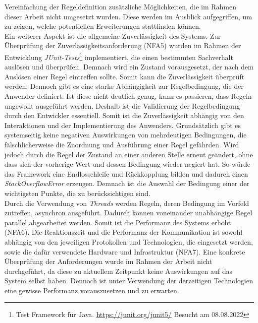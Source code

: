         Vereinfachung der Regeldefinition zusätzliche Möglichkeiten, die im Rahmen dieser Arbeit nicht umgesetzt wurden. Diese werden im Ausblick 
        aufgegriffen, um zu zeigen, welche potentiellen Erweiterungen stattfinden können. 
        \\
        \linebreak
        Ein weiterer Aspekt ist die allgemeine Zuverlässigkeit des Systems. Zur Überprüfung der Zuverlässigkeitsanforderung (NFA5) wurden im Rahmen der 
        Entwicklung \textit{JUnit-Tests}\footnote{Test Framework für Java. \url{https://junit.org/junit5/} Besucht am 08.08.2022} implementiert, die 
        einen bestimmten Sachverhalt auslösen und überprüfen. Demnach wird ein Zustand vorausgesetzt, der nach dem Auslösen einer Regel eintreffen sollte. Somit kann 
        die Zuverlässigkeit überprüft werden. Dennoch gibt es eine starke Abhängigkeit zur Regelbedingung, die der Anwender definiert. Ist diese 
        nicht deutlich genug, kann es passieren, dass Regeln ungewollt ausgeführt werden. Deshalb ist die Validierung der Regelbedingung durch den 
        Entwickler essentiell. Somit ist die Zuverlässigkeit abhängig von den Interaktionen und der Implementierung des Anwenders. Grundsätzlich gibt es 
        systemseitig keine negativen Auswirkungen von mehrdeutigen Bedingungen, die fälschlicherweise die Zuordnung und Ausführung einer Regel gefährden. Wird jedoch durch die 
        Regel der Zustand an einer anderen Stelle erneut geändert, ohne dass sich der vorherige Wert und dessen Bedingung wieder negiert hat. So würde das 
        Framework eine Endlosschleife und Rückkopplung bilden und dadurch einen \textit{StackOverflowError} erzeugen. Demnach ist die Auswahl der Bedingung einer der wichtigsten 
        Punkte, die zu berücksichtigen sind.
        \\
        \linebreak
        Durch die Verwendung von \textit{Threads} werden Regeln, deren Bedingung im Vorfeld zutreffen, asynchron ausgeführt. Dadurch können voneinander 
        unabhängige Regel parallel abgearbeitet werden. Somit ist die Performanz des Systems erhöht (NFA6). Die Reaktionszeit und die Performanz der 
        Kommunikation ist sowohl abhängig von den jeweiligen Protokollen und Technologien, die eingesetzt werden, sowie die dafür verwendete Hardware 
        und Infrastruktur (NFA7). Eine konkrete Überprüfung der Anforderungen wurde im Rahmen der Arbeit nicht durchgeführt, da diese zu aktuellem Zeitpunkt keine 
        Auswirkungen auf das System selbst haben. Dennoch ist unter Verwendung der derzeitigen Technologien eine gewisse Performanz vorauszusetzen und zu erwarten. 
